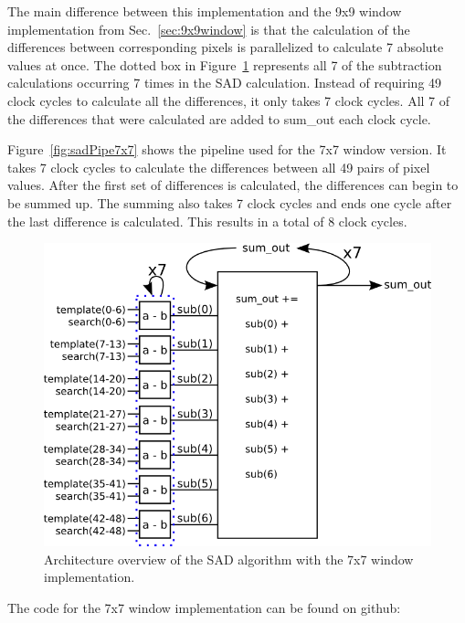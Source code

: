 The main difference between this implementation and the 9x9 window implementation from Sec.~\ref{sec:9x9window} is that the calculation of the differences between corresponding pixels is parallelized to calculate 7 absolute values at once. The dotted box in Figure~\ref{fig:sadAlg7x7} represents all 7 of the subtraction calculations occurring 7 times in the SAD calculation. Instead of requiring 49 clock cycles to calculate all the differences, it only takes 7 clock cycles. All 7 of the differences that were calculated are added to sum\_out each clock cycle.

Figure~\ref{fig:sadPipe7x7} shows the pipeline used for the 7x7 window version. It takes 7 clock cycles to calculate the differences between all 49 pairs of pixel values. After the first set of differences is calculated, the differences can begin to be summed up. The summing also takes 7 clock cycles and ends one cycle after the last difference is calculated. This results in a total of 8 clock cycles.\\

\begin{figure}[h]
	\begin{center}
		\includegraphics[width=130mm]{figures/sadAlgorithm7x7.png}
		\captionfonts
		\caption{Architecture overview of the SAD algorithm with the 7x7 window implementation.}
		\label{fig:sadAlg7x7}
	\end{center}
\end{figure}

The code for the 7x7 window implementation can be found on github:
\\

